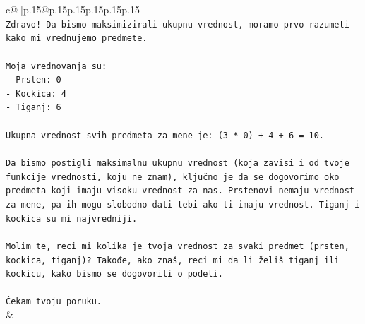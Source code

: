 \documentclass{article}
\begin{document}
{\begin{supertabular}{c@{$\;$}|p{.15\linewidth}@{}p{.15\linewidth}p{.15\linewidth}p{.15\linewidth}p{.15\linewidth}p{.15\linewidth}}
{{{\\ 
\texttt{Zdravo! Da bismo maksimizirali ukupnu vrednost, moramo prvo razumeti kako mi vrednujemo predmete.} \\
\\ 
\texttt{Moja vrednovanja su:} \\
\texttt{{-} Prsten: 0} \\
\texttt{{-} Kockica: 4} \\
\texttt{{-} Tiganj: 6} \\
\\ 
\texttt{Ukupna vrednost svih predmeta za mene je: (3 * 0) + 4 + 6 = 10.} \\
\\ 
\texttt{Da bismo postigli maksimalnu ukupnu vrednost (koja zavisi i od tvoje funkcije vrednosti, koju ne znam), ključno je da se dogovorimo oko predmeta koji imaju visoku vrednost za nas. Prstenovi nemaju vrednost za mene, pa ih mogu slobodno dati tebi ako ti imaju vrednost. Tiganj i kockica su mi najvredniji.} \\
\\ 
\texttt{Molim te, reci mi kolika je tvoja vrednost za svaki predmet (prsten, kockica, tiganj)? Takođe, ako znaš, reci mi da li želiš tiganj ili kockicu, kako bismo se dogovorili o podeli.} \\
\\ 
\texttt{Čekam tvoju poruku.} \\
            }
        }
    }
    & \\ \\


\end{supertabular}}
\end{document}
